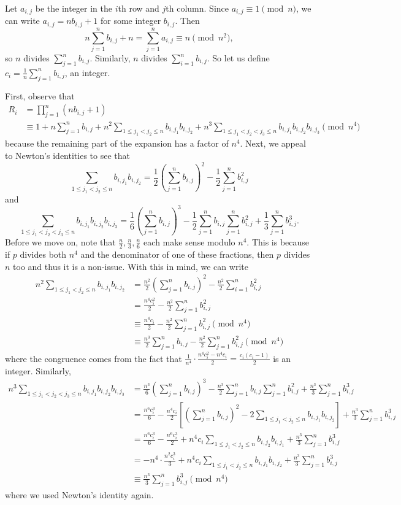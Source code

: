 Let $a_{i,j}$ be the integer in the $i$th row and $j$th column. Since $a_{i,j}\equiv1\pmod{n}$, we can write $a_{i,j}=nb_{i,j}+1$ for some integer $b_{i,j}$. Then \[n\sum_{j=1}^nb_{i,j}+n=\sum_{j=1}^na_{i,j}\equiv n\pmod{n^2},\] so $n$ divides $\displaystyle\sum_{j=1}^nb_{i,j}$. Similarly, $n$ divides $\displaystyle\sum_{i=1}^nb_{i,j}$. So let us define $c_i=\frac{1}{n}\displaystyle\sum_{j=1}^nb_{i,j}$, an integer.

First, observe that
\begin{align*}
	R_i&=\prod_{j=1}^n(nb_{i,j}+1)\\
	&\equiv1+n\sum_{j=1}^nb_{i,j}+n^2\sum_{1\leq j_1<j_2\leq n}b_{i,j_1}b_{i,j_2}+n^3\sum_{1\leq j_1<j_2<j_3\leq n}b_{i,j_1}b_{i,j_2}b_{i,j_3}\pmod{n^4}
\end{align*}
because the remaining part of the expansion has a factor of $n^4$. Next, we appeal to Newton's identities to see that \[\sum_{1\leq j_1<j_2\leq n}b_{i,j_1}b_{i,j_2}=\frac{1}{2}\left(\sum_{j=1}^nb_{i,j}\right)^2-\frac{1}{2}\sum_{j=1}^nb_{i,j}^2\] and \[\sum_{1\leq j_1<j_2<j_3\leq n}b_{i,j_1}b_{i,j_2}b_{i,j_3}=\frac{1}{6}\left(\sum_{j=1}^nb_{i,j}\right)^3-\frac{1}{2}\sum_{j=1}^nb_{i,j}\sum_{j=1}^nb_{i,j}^2+\frac{1}{3}\sum_{j=1}^nb_{i,j}^3.\] Before we move on, note that $\frac{n}{2},\frac{n}{3},\frac{n}{6}$ each make sense modulo $n^4$. This is because if $p$ divides both $n^4$ and the denominator of one of these fractions, then $p$ divides $n$ too and thus it is a non-issue. With this in mind, we can write
\begin{align*}
	n^2\sum_{1\leq j_1<j_2\leq n}b_{i,j_1}b_{i,j_2}&=\frac{n^2}{2}\left(\sum_{j=1}^nb_{i,j}\right)^2-\frac{n^2}{2}\sum_{i=1}^nb_{i,j}^2\\
	&=\frac{n^4c_i^2}{2}-\frac{n^2}{2}\sum_{j=1}^nb_{i,j}^2\\
	&\equiv\frac{n^4c_i}{2}-\frac{n^2}{2}\sum_{j=1}^nb_{i,j}^2\pmod{n^4}\\
	&\equiv\frac{n^3}{2}\sum_{j=1}^nb_{i,j}-\frac{n^2}{2}\sum_{j=1}^nb_{i,j}^2\pmod{n^4}
\end{align*}
where the congruence comes from the fact that $\frac{1}{n^4}\cdot\frac{n^4c_i^2-n^4c_i}{2}=\frac{c_i(c_i-1)}{2}$ is an integer. Similarly,
\begin{align*}
	n^3\sum_{1\leq j_1<j_2<j_3\leq n}b_{i,j_1}b_{i,j_2}b_{i,j_3}&=\frac{n^3}{6}\left(\sum_{j=1}^nb_{i,j}\right)^3-\frac{n^3}{2}\sum_{j=1}^nb_{i,j}\sum_{j=1}^nb_{i,j}^2+\frac{n^3}{3}\sum_{j=1}^nb_{i,j}^3\\
	&=\frac{n^6c_i^3}{6}-\frac{n^4c_i}{2}\left[\left(\sum_{j=1}^nb_{i,j}\right)^2-2\sum_{1\leq j_1<j_2\leq n}b_{i,j_1}b_{i,j_2}\right]+\frac{n^3}{3}\sum_{j=1}^nb_{i,j}^3\\
	&=\frac{n^6c_i^3}{6}-\frac{n^6c_i^3}{2}+n^4c_i\sum_{1\leq j_1<j_2\leq n}b_{i,j_2}b_{i,j_1}+\frac{n^3}{3}\sum_{j=1}^nb_{i,j}^3\\
	&=-n^4\cdot\frac{n^2c_i^3}{3}+n^4c_i\sum_{1\leq j_1<j_2\leq n}b_{i,j_1}b_{i,j_2}+\frac{n^3}{3}\sum_{j=1}^nb_{i,j}^3\\
	&\equiv\frac{n^3}{3}\sum_{j=1}^nb_{i,j}^3\pmod{n^4}
\end{align*}
where we used Newton's identity again.


